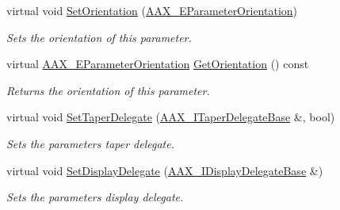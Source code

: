 \begin{DoxyCompactItemize}
virtual void \hyperlink{a00040_a959cce4a5c6098cc66e8140cc9c81eb2}{Set\+Orientation} (\hyperlink{a00206_a52f91d1c14aa5dceedabfb9d2de31bf0}{A\+A\+X\+\_\+\+E\+Parameter\+Orientation})
\begin{DoxyCompactList}\small\item\em Sets the orientation of this parameter. \end{DoxyCompactList}\item 
virtual \hyperlink{a00206_a52f91d1c14aa5dceedabfb9d2de31bf0}{A\+A\+X\+\_\+\+E\+Parameter\+Orientation} \hyperlink{a00040_a0c5a4bfa9a040d9190bb71aa5effcc5f}{Get\+Orientation} () const 
\begin{DoxyCompactList}\small\item\em Returns the orientation of this parameter. \end{DoxyCompactList}\item 
virtual void \hyperlink{a00040_aaeb0d6492ec9d3f5bc7a4b07aa5b2211}{Set\+Taper\+Delegate} (\hyperlink{a00115}{A\+A\+X\+\_\+\+I\+Taper\+Delegate\+Base} \&, bool)
\begin{DoxyCompactList}\small\item\em Sets the parameter\textquotesingle{}s taper delegate. \end{DoxyCompactList}\item 
virtual void \hyperlink{a00040_a758f9b05d652764ac4265dfbfedaf4a0}{Set\+Display\+Delegate} (\hyperlink{a00093}{A\+A\+X\+\_\+\+I\+Display\+Delegate\+Base} \&)
\begin{DoxyCompactList}\small\item\em Sets the parameter\textquotesingle{}s display delegate. \end{DoxyCompactList}\end{DoxyCompactItemize}
